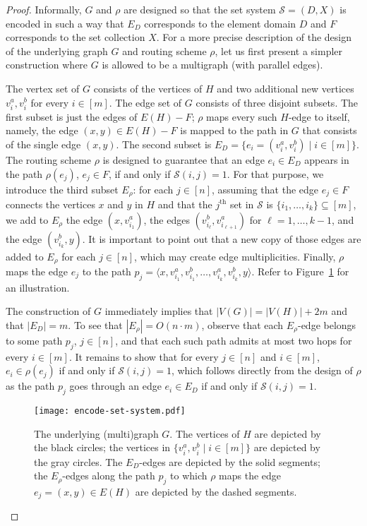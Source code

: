 \LongVersion \documentclass[11pt]{article}
\theoremstyle{definition}
\theoremstyle{plain}
\newcommand{\Vertices}[0]{\mathit{V}}
\newcommand{\Edges}[0]{\mathit{E}}
\newcommand{\CalS}[0]{\mathcal{S}}
\begin{document}
\begin{proof}
Informally, $G$ and $\rho$ are designed so that the set system $\CalS=(D,X)$
is encoded in such a way that $E_{D}$ corresponds to the element domain $D$
and $F$ corresponds to the set collection $X$. For a more precise description 
of the design of the underlying graph $G$ and routing scheme $\rho$, 
let us first present a simpler construction where $G$ is allowed to be 
a multigraph (with parallel edges).

The vertex set of $G$ consists of the vertices of $H$ and two additional new
vertices $v_{i}^{a}, v_{i}^{b}$ for every $i \in [m]$.
The edge set of $G$ consists of three disjoint subsets.
The first subset is just the edges of $\Edges(H) - F$;
$\rho$ maps every such $H$-edge to itself, namely, the edge 
$(x, y) \in \Edges(H) - F$ is mapped to the path in $G$
that consists of the single edge $(x, y)$.
The second subset is $E_{D} = \{ e_i = (v_{i}^{a}, v_{i}^{b}) \mid i \in [m]\}$.
The routing scheme $\rho$ is designed to guarantee that an edge $e_i \in
E_{D}$ appears in the path $\rho(e_j)$, $e_j \in F$, if and only if $\CalS(i,
j) = 1$.
For that purpose, we introduce the third subset $E_{\rho}$:
for each $j \in [n]$, assuming that the edge $e_j \in F$ connects the vertices
$x$ and $y$ in $H$ and that the $j^{\text{th}}$ set in $\CalS$ is $\{ i_1,
\dots, i_k \} \subseteq [m]$, we add to $E_{\rho}$ the edge $(x,
v_{i_1}^{a})$, the edges $(v_{i_{\ell}}^{b}, v_{i_{\ell + 1}}^{a})$ for $\ell
= 1, \dots, k - 1$, and the edge $(v_{i_{k}}^{b}, y)$.
It is important to point out that a new copy of those edges are added to
$E_{\rho}$ for each $j \in [n]$, which may create edge multiplicities.
Finally, $\rho$ maps the edge $e_j$ to the path $p_j = \langle x, v_{i_1}^{a},
v_{i_1}^{b}, \dots, v_{i_k}^{a}, v_{i_k}^{b}, y \rangle$.
Refer to Figure~\ref{figure:EncodeSetSystem} for an illustration.

The construction of $G$ immediately implies that $|\Vertices(G)| =
|\Vertices(H)| + 2 m$ and that $|E_{D}| = m$.
To see that $|E_{\rho}| = O (n \cdot m)$, observe that each
$E_{\rho}$-edge belongs to some path $p_j$, $j \in [n]$, and that each such
path admits at most two hops for every $i \in [m]$.
It remains to show that for every $j \in [n]$ and $i \in [m]$, $e_i \in
\rho(e_j)$ if and only if $\CalS(i, j) = 1$, which follows directly
from the design of $\rho$ as the path $p_j$ goes through an edge $e_i \in
E_{D}$ if and only if $\CalS(i, j) = 1$.

\begin{figure}
\begin{center}
\texttt{[image: encode-set-system.pdf]}
\end{center}
\caption{\label{figure:EncodeSetSystem}
The underlying (multi)graph $G$.
The vertices of $H$ are depicted by the black circles;
the vertices in $\{ v_{i}^{a}, v_{i}^{b} \mid i \in [m] \}$ are depicted by
the gray circles.
The $E_{D}$-edges are depicted by the solid segments;
the $E_{\rho}$-edges along the path $p_j$ to which $\rho$ maps the edge $e_j =
(x, y) \in \Edges(H)$ are depicted by the dashed segments.
}
\vspace*{-.5cm}
\end{figure}


\end{proof}
\end{document}
